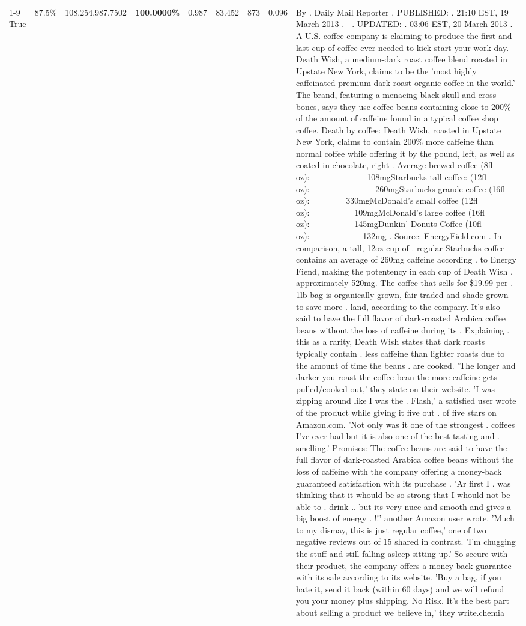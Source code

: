 \begin{table}[H]
{\begin{tabular}{lllrlllll}
\cline{1-9} \cline{2-9}
True & 87.5\% & 108,254,987.7502 & \bfseries \color{red} 100.0000\% & 0.987 & 83.452 & 873 & 0.096 & By . Daily Mail Reporter . PUBLISHED: . 21:10 EST, 19 March 2013 . | . UPDATED: . 03:06 EST, 20 March 2013 . A U.S. coffee company is claiming to produce the first and last cup of coffee ever needed to kick start your work day. Death Wish, a medium-dark roast coffee blend roasted in Upstate New York, claims to be the 'most highly caffeinated premium dark roast organic coffee in the world.' The brand, featuring a menacing black skull and cross bones, says they use coffee beans containing close to 200\% of the amount of caffeine found in a typical coffee shop coffee. Death by coffee: Death Wish, roasted in Upstate New York, claims to contain 200\% more caffeine than normal coffee while offering it by the pound, left, as well as coated in chocolate, right . Average brewed coffee (8fl oz):              108mgStarbucks tall coffee: (12fl oz):                260mgStarbucks grande coffee (16fl oz):         330mgMcDonald's small coffee (12fl oz):           109mgMcDonald's large coffee (16fl oz):           145mgDunkin' Donuts Coffee (10fl oz):             132mg . Source: EnergyField.com . In comparison, a tall, 12oz cup of . regular Starbucks coffee contains an average of 260mg caffeine according . to Energy Fiend, making the potentency in each cup of Death Wish . approximately 520mg. The coffee that sells for \$19.99 per . 1lb bag is organically grown, fair traded and shade grown to save more . land, according to the company. It's also said to have the full flavor of dark-roasted Arabica coffee beans without the loss of caffeine during its . Explaining . this as a rarity, Death Wish states that dark roasts typically contain . less caffeine than lighter roasts due to the amount of time the beans . are cooked. 'The longer and darker you roast the coffee bean the more caffeine gets pulled/cooked out,' they state on their website. 'I was zipping around like I was the . Flash,' a satisfied user wrote of the product while giving it five out . of five stars on Amazon.com. 'Not only was it one of the strongest . coffees I've ever had but it is also one of the best tasting and . smelling.’ Promises: The coffee beans are said to have the full flavor of dark-roasted Arabica coffee beans without the loss of caffeine with the company offering a money-back guaranteed satisfaction with its purchase . 'Ar first I . was thinking that it whould be so strong that I whould not be able to . drink .. but its very nuce and smooth and gives a big boost of energy . !!' another Amazon user wrote. 'Much to my dismay, this is just regular coffee,' one of two negative reviews out of 15 shared in contrast. 'I'm chugging the stuff and still falling asleep sitting up.' So secure with their product, the company offers a money-back guarantee with its sale according to its website. 'Buy a bag, if you hate it, send it back (within 60 days) and we will refund you your money plus shipping. No Risk. It’s the best part about selling a product we believe in,' they write.chemia \\

\end{tabular}}
\end{table}
